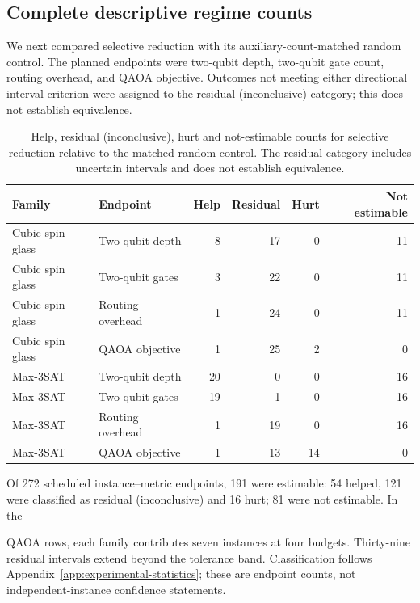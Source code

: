 \documentclass[a4paper,onecolumn,11pt,unpublished]{quantumarticle}
\theoremstyle{remark}
\begin{document}
\FloatBarrier

\subsection{Complete descriptive regime counts}
\label{app:results-regimes}

We next compared selective reduction with its auxiliary-count-matched random
control.  The planned endpoints were two-qubit depth, two-qubit gate count,
routing overhead, and QAOA objective.  Outcomes not meeting either directional interval criterion were assigned
to the residual (inconclusive) category; this does not establish equivalence.

\begin{table}[!htbp]
    \centering
    \small
    \caption{Help, residual (inconclusive), hurt and not-estimable counts for
    selective reduction relative to the matched-random control. The residual
    category includes uncertain intervals and does not establish equivalence.}
    \label{tab:e5-regime-summary}
    \begin{tabular}{@{}llrrrr@{}}
        \toprule
        Family & Endpoint & Help & Residual & Hurt & Not estimable\\
        \midrule
        Cubic spin glass & Two-qubit depth  & 8 & 17 & 0 & 11\\
        Cubic spin glass & Two-qubit gates  & 3 & 22 & 0 & 11\\
        Cubic spin glass & Routing overhead & 1 & 24 & 0 & 11\\
        Cubic spin glass & QAOA objective   & 1 & 25 & 2 & 0\\
        \addlinespace
        Max-3SAT & Two-qubit depth  & 20 & 0 & 0 & 16\\
        Max-3SAT & Two-qubit gates  & 19 & 1 & 0 & 16\\
        Max-3SAT & Routing overhead & 1 & 19 & 0 & 16\\
        Max-3SAT & QAOA objective   & 1 & 13 & 14 & 0\\
        \bottomrule
    \end{tabular}
\end{table}

Of 272 scheduled instance--metric endpoints, 191 were estimable: 54 helped,
121 were classified as residual (inconclusive) and 16 hurt; 81 were not estimable. In the

QAOA rows, each family contributes seven instances at four budgets.
Thirty-nine residual intervals extend beyond the tolerance band.
Classification follows
Appendix~\ref{app:experimental-statistics}; these are endpoint counts,
not independent-instance confidence statements.
\end{document}
